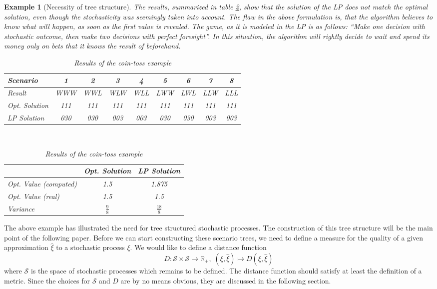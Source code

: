 \documentclass[a4paper, 12pt] {article}
\newtheorem*{example}{Example}
\begin{document}
\begin{example}[Necessity of tree structure]
The results, summarized in table \ref{tab:coin-toss-results}, show that the solution of the LP does not match the optimal solution, even though the stochasticity was seemingly taken into account. The flaw in the above formulation is, that the algorithm believes to know what will happen, as soon as the first value is revealed. The game, as it is modeled in the LP is as follows: ``Make one decision with stochastic outcome, then make two decisions with perfect foresight''. In this situation, the algorithm will rightly decide to wait and spend its money only on bets that it knows the result of beforehand.
\begin{table}
  \small\centering
  \begin{tabular}{lcccccccc}
    \hline 
    Scenario&1&2&3&4&5&6&7&8\\\hline\hline
    Result&WWW&WWL&WLW&WLL&LWW&LWL&LLW&LLL\\
    Opt. Solution&111&111&111&111&111&111&111&111\\
    LP Solution&030&030&003&003&030&030&003&003\\\hline
  \end{tabular}
  \vspace*{0.5cm}\\
  \begin{tabular}{lcc}
    \hline
    &Opt. Solution&LP Solution\\\hline\hline
    Opt. Value (computed)&1.5&1.875\\
    Opt. Value (real)&1.5&1.5\\
    Variance&$\frac{9}{8}$&$\frac{18}{8}$\\
    \hline
  \end{tabular}
  \caption{Results of the coin-toss example}
  \label{tab:coin-toss-results}
\end{table}
\end{example}

The above example has illustrated the need for tree structured stochastic processes. The construction of this tree structure will be the main point of the following paper. Before we can start constructing these scenario trees, we need to define a measure for the quality of a given approximation $\hat{\xi}$ to a stochastic process $\xi$. We would like to define a distance function 
\begin{equation}
  \label{eq:distance_function_intro}
  D:\mathcal{S} \times \mathcal{S} \rightarrow \mathbb{R}_+,\;(\xi, \hat{\xi})\mapsto D(\xi, \hat{\xi})
\end{equation}
where $\mathcal{S}$ is the space of stochastic processes which remains to be defined. The distance function should satisfy at least the definition of a metric. Since the choices for $\mathcal{S}$ and $D$ are by no means obvious, they are discussed in the following section.
\end{document}

